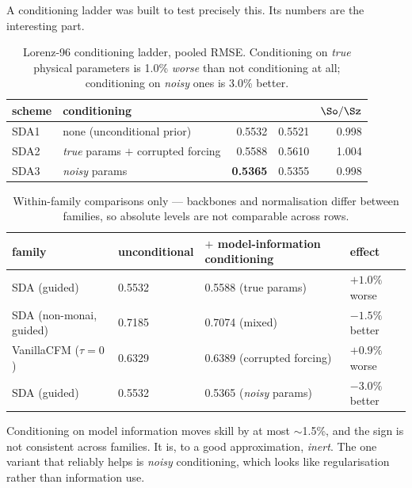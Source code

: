 A conditioning ladder was built to test precisely this. Its \Sz{} numbers are the
interesting part.

\begin{table}[t]
\centering
\small
\begin{tabular}{@{}llrrr@{}}
\toprule
\textbf{scheme} & \textbf{conditioning} & \textbf{\Sz{}} & \textbf{\So{}} & $\So/\Sz$ \\
\midrule
SDA1 & none (unconditional prior)             & 0.5532 & 0.5521 & 0.998 \\
SDA2 & \emph{true} params $+$ corrupted forcing & 0.5588 & 0.5610 & 1.004 \\
SDA3 & \emph{noisy} params                     & \textbf{0.5365} & 0.5355 & 0.998 \\
\bottomrule
\end{tabular}
\caption{Lorenz-96 conditioning ladder, pooled RMSE. Conditioning on \emph{true}
physical parameters is 1.0\% \emph{worse} than not conditioning at all;
conditioning on \emph{noisy} ones is 3.0\% better.}
\label{tab:ladder}
\end{table}

\begin{table}[t]
\centering
\small
\begin{tabular}{@{}llll@{}}
\toprule
\textbf{family} & \textbf{unconditional} & \textbf{$+$ model-information conditioning} & \textbf{effect} \\
\midrule
SDA (guided)             & 0.5532 & 0.5588 (true params)       & $+1.0\%$ worse \\
SDA (non-monai, guided)  & 0.7185 & 0.7074 (mixed)             & $-1.5\%$ better \\
VanillaCFM ($\tau{=}0$)  & 0.6329 & 0.6389 (corrupted forcing) & $+0.9\%$ worse \\
SDA (guided)             & 0.5532 & 0.5365 (\emph{noisy} params) & $-3.0\%$ better \\
\bottomrule
\end{tabular}
\caption{Within-family comparisons only --- backbones and normalisation differ
between families, so absolute levels are not comparable across rows.}
\label{tab:families}
\end{table}

Conditioning on model information moves \Sz{} skill by at most $\sim$1.5\%, and
the sign is not consistent across families. It is, to a good approximation,
\emph{inert}. The one variant that reliably helps is \emph{noisy} conditioning,
which looks like regularisation rather than information use.

